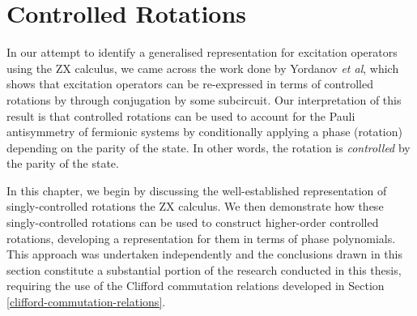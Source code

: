 \chapter{Controlled Rotations}%
\label{controlled-rotations}

In our attempt to identify a generalised representation for excitation operators using the ZX calculus, we came across the work done by Yordanov \textit{et al}, which shows that excitation operators can be re-expressed in terms of controlled rotations by through conjugation by some subcircuit. Our interpretation of this result is that controlled rotations can be used to account for the Pauli antisymmetry of fermionic systems by conditionally applying a phase (rotation) depending on the parity of the state. In other words, the rotation is \textit{controlled} by the parity of the state.

In this chapter, we begin by discussing the well-established representation of singly-controlled rotations the ZX calculus. We then demonstrate how these singly-controlled rotations can be used to construct higher-order controlled rotations, developing a representation for them in terms of phase polynomials. This approach was undertaken independently and the conclusions drawn in this section constitute a substantial portion of the research conducted in this thesis, requiring the use of the Clifford commutation relations developed in Section \ref{clifford-commutation-relations}.
